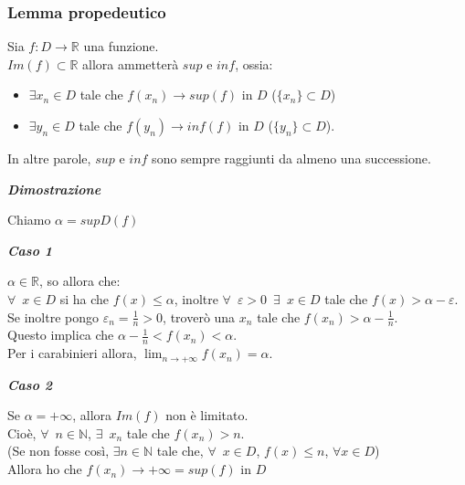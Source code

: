 \documentclass{article}
\theoremstyle{definition}
\begin{document}
\subsubsection{Lemma propedeutico}
Sia $f:D \to \mathbb{R}$ una funzione.
\\
$Im(f) \subset \mathbb{R}$ allora ammetterà $sup$ e $inf$, ossia:
\begin{itemize}
    \item $\exists x_n \in D$ tale che $f(x_n) \to sup(f)$ in $D$ ($\{x_n\} \subset D$)
    \item $\exists y_n \in D$ tale che $f(y_n) \to inf(f)$ in $D$ ($\{y_n\} \subset D$).
    \\
\end{itemize}
    In altre parole, $sup$ e $inf$ sono sempre raggiunti da almeno una successione.
\begin{center}
    \textbf{\textit{Dimostrazione}}
\end{center}
Chiamo $\alpha=supD(f)$
\begin{center}
    \textbf{\textit{Caso 1}}
\end{center}
$\alpha \in \mathbb{R}$, so allora che:
\\
$\forall \,\,\, x \in D$ si ha che $f(x) \leqslant \alpha$, inoltre $\forall \,\,\, \varepsilon>0 \,\,\, \exists \,\,\, x \in D$ tale che $f(x) > \alpha - \varepsilon$.
\\
Se inoltre pongo $\varepsilon_n=\frac{1}{n}>0$, troverò una $x_n$ tale che $f(x_n)>\alpha-\frac{1}{n}$.
\\
Questo implica che $\alpha- \frac{1}{n}<f(x_n)<\alpha$.
\\
Per i carabinieri allora, $\lim_{n \to +\infty }f(x_n)= \alpha$.
\begin{center}
    \textbf{\textit{Caso 2}}
\end{center}
Se $\alpha=+\infty$, allora $Im(f)$ non è limitato.
\\
Cioè, $\forall \,\,\, n \in \mathbb{N}$, $\exists \,\,\, x_n$ tale che $f(x_n)>n$.
\\
(Se non fosse così, $\exists n \in \mathbb{N}$ tale che, $\forall \,\,\, x \in D$, $f(x) \leqslant n$, $\forall x \in D$)
\\
Allora ho che $f(x_n) \to +\infty=sup(f)$ in $D$
\end{document}
